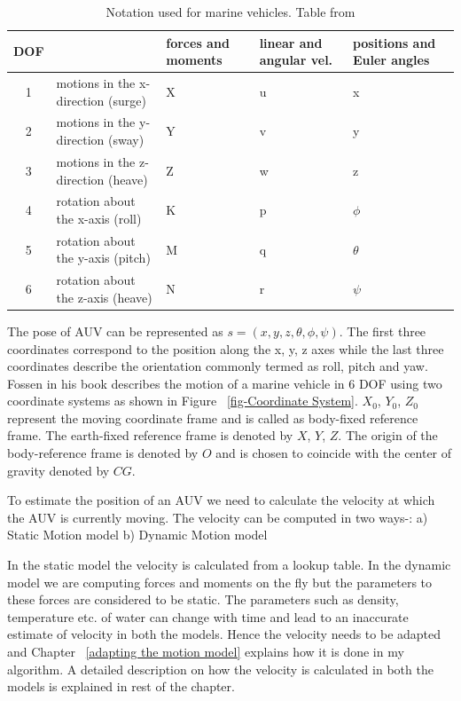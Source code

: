\documentclass[12pt]{dalcsthesis}
\begin{document}
\begin{table}[tbh]
\centering
\label{marine notation}
\begin{tabular}{|c|>{\centering}p{3cm}|>{\centering}p{3cm}|>{\centering}p{3cm}|>{\centering}p{3cm}|}
\hline 
DOF &  & forces and moments & linear and angular vel. & positions and Euler angles\tabularnewline
\hline 
\hline 
1 & motions in the x-direction (surge) & X & u & x\tabularnewline
\hline 
2 & motions in the y-direction (sway) & Y & v & y\tabularnewline
\hline 
3 & motions in the z-direction (heave) & Z & w & z\tabularnewline
\hline 
4 & rotation about the x-axis (roll) & K & p & $\phi$\tabularnewline
\hline 
5 & rotation about the y-axis (pitch) & M & q & $\theta$\tabularnewline
\hline 
6 & rotation about the z-axis (heave) & N & r & $\psi$\tabularnewline
\hline 
\end{tabular}
\caption{Notation used for marine vehicles. Table from \cite{Thor}}
\end{table}

The pose of AUV can be represented as $s=(x,y,z,\theta,\phi,\psi)$. The first three coordinates correspond to the position along the x, y, z axes while the last three coordinates describe the orientation commonly termed as roll, pitch and yaw. Fossen \cite{Thor} in his book describes the motion of a marine vehicle in 6 DOF using two coordinate systems as shown in Figure ~\ref{fig-Coordinate System}. $X_0$, $Y_0$, $Z_0$ represent the moving coordinate frame and is called as body-fixed reference frame. The earth-fixed reference frame is denoted by $X$, $Y$, $Z$. The origin of the body-reference frame is denoted by $O$ and is chosen to coincide with the center of gravity denoted by $CG$.  

To estimate the position of an AUV we need to calculate the velocity at which the AUV is currently moving. The velocity can be computed in two ways-: a) Static Motion model b) Dynamic Motion model

In the static model the velocity is calculated from a lookup table. In the dynamic model we are computing forces and moments on the fly but the parameters to these forces are considered to be static. The parameters such as density, temperature etc. of water can change with time and lead to an inaccurate estimate of velocity in both the models. Hence the velocity needs to be adapted and Chapter ~\ref{adapting the motion model} explains how it is done in my algorithm. A detailed description on how the velocity is calculated in both the models is explained in rest of the chapter.
\end{document}
